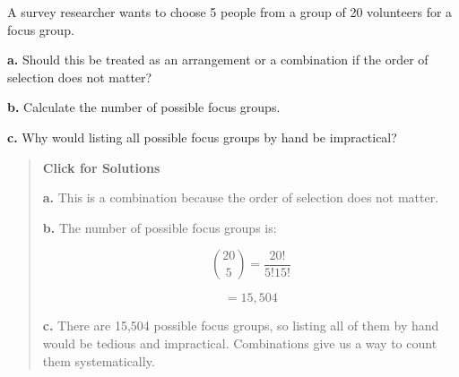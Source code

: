 \documentclass[
  letterpaper,
  DIV=11,
  numbers=noendperiod]{scrreprt}
\begin{document}
\begin{tcolorbox}[enhanced jigsaw, arc=.35mm, bottomrule=.15mm, bottomtitle=1mm, breakable, colback=white, colbacktitle=quarto-callout-note-color!10!white, colframe=quarto-callout-note-color-frame, coltitle=black, left=2mm, leftrule=.75mm, opacityback=0, opacitybacktitle=0.6, rightrule=.15mm, title=\textcolor{quarto-callout-note-color}{\faInfo}\hspace{0.5em}{Question 14}, titlerule=0mm, toprule=.15mm, toptitle=1mm]

A survey researcher wants to choose 5 people from a group of 20
volunteers for a focus group.

\textbf{a.} Should this be treated as an arrangement or a combination if
the order of selection does not matter?

\textbf{b.} Calculate the number of possible focus groups.

\textbf{c.} Why would listing all possible focus groups by hand be
impractical?

\begin{quote}
\textbf{Click for Solutions}

\textbf{a.} This is a combination because the order of selection does
not matter.

\textbf{b.} The number of possible focus groups is:

\[
\binom{20}{5} = \frac{20!}{5!15!}
\]

\[
= 15{,}504
\]

\textbf{c.} There are 15,504 possible focus groups, so listing all of
them by hand would be tedious and impractical. Combinations give us a
way to count them systematically.
\end{quote}

\end{tcolorbox}
\end{document}
